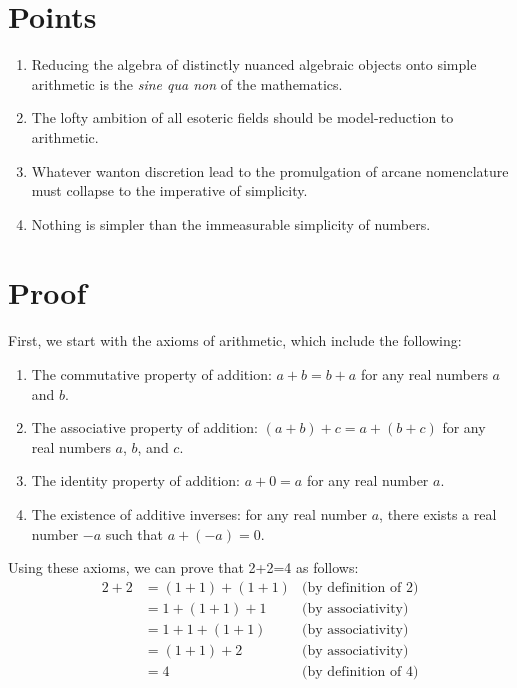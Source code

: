 \section{Points}
\begin{enumerate}
    \item Reducing the algebra of distinctly nuanced algebraic objects onto simple
          arithmetic is the \textit{sine qua non} of the mathematics.
    \item The lofty ambition of all esoteric fields should be model-reduction to
          arithmetic.
    \item Whatever wanton discretion lead to the promulgation of arcane nomenclature must
          collapse to the imperative of simplicity.
    \item Nothing is simpler than the immeasurable simplicity of numbers.
\end{enumerate}

\section{Proof}
First, we start with the axioms of arithmetic, which include the following:
\begin{enumerate}
    \item The commutative property of addition: $a+b=b+a$ for any real numbers $a$ and
          $b$.
    \item The associative property of addition: $(a+b)+c=a+(b+c)$ for any real numbers
          $a$, $b$, and $c$.
    \item The identity property of addition: $a+0=a$ for any real number $a$.
    \item The existence of additive inverses: for any real number $a$, there exists a
          real number $-a$ such that $a+(-a)=0$.
\end{enumerate}

Using these axioms, we can prove that 2+2=4 as follows:
\begin{align*}
    2+2 & = (1+1)+(1+1) & \text{(by definition of 2)} \\
        & = 1+(1+1)+1   & \text{(by associativity)}   \\
        & = 1+1+(1+1)   & \text{(by associativity)}   \\
        & = (1+1)+2     & \text{(by associativity)}   \\
        & = 4           & \text{(by definition of 4)}
\end{align*}

